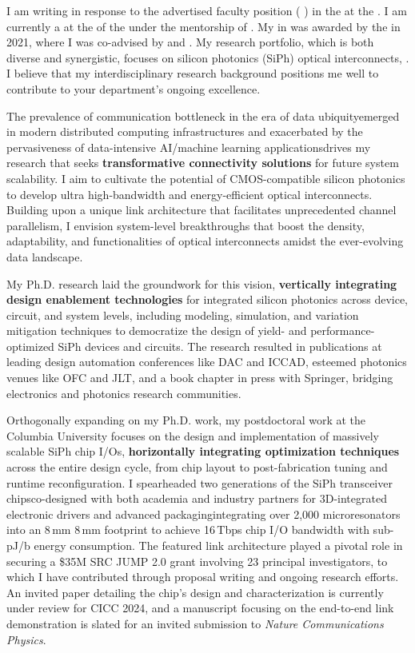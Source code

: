 I am writing in response to the advertised faculty position (\textbf{\appPosition{} \appJobID}) in the \appDept{} at the \appSchool{}. I am currently a \myTitle{} at the \myDept{} of the \mySchoolShort{} under the mentorship of \mySuper{}. My \myDegree{} in \myMajor{} was awarded by the \myPhDSchool{} in 2021, where I was co-advised by \myAdvisor{} and \myCoAdvisor{}. My research portfolio, which is both diverse and synergistic, focuses on silicon photonics (SiPh) optical interconnects, \appSpecific{}. I believe that my interdisciplinary research background positions me well to contribute to your department's ongoing excellence.

The prevalence of communication bottleneck in the era of data ubiquity\textemdash emerged in modern distributed computing infrastructures and exacerbated by the pervasiveness of data-intensive AI/machine learning applications\textemdash drives my research that seeks \textbf{transformative connectivity solutions} for future system scalability. I aim to cultivate the potential of CMOS-compatible silicon photonics to develop ultra high-bandwidth and energy-efficient optical interconnects. Building upon a unique link architecture that facilitates unprecedented channel parallelism, I envision system-level breakthroughs that boost the density, adaptability, and functionalities of optical interconnects amidst the ever-evolving data landscape.

My Ph.D. research laid the groundwork for this vision, \textbf{vertically integrating design enablement technologies} for integrated silicon photonics across device, circuit, and system levels, including modeling, simulation, and variation mitigation techniques to democratize the design of yield- and performance-optimized SiPh devices and circuits. The research resulted in publications at leading design automation conferences like DAC and ICCAD, esteemed photonics venues like OFC and JLT, and a book chapter in press with Springer, bridging electronics and photonics research communities.

Orthogonally expanding on my Ph.D. work, my postdoctoral work at the Columbia University focuses on the design and implementation of massively scalable SiPh chip I/Os, \textbf{horizontally integrating optimization techniques} across the entire design cycle, from chip layout to post-fabrication tuning and runtime reconfiguration. I spearheaded two generations of the SiPh transceiver chips\textemdash co-designed with both academia and industry partners for 3D-integrated electronic drivers and advanced packaging\textemdash integrating over 2,000 microresonators into an 8\,mm \texttimes{} 8\,mm footprint to achieve 16\,Tbps chip I/O bandwidth with sub-pJ/b energy consumption. The featured link architecture played a pivotal role in securing a \$35M SRC JUMP 2.0 grant involving 23 principal investigators, to which I have contributed through proposal writing and ongoing research efforts. An invited paper detailing the chip's design and characterization is currently under review for CICC 2024, and a manuscript focusing on the end-to-end link demonstration is slated for an invited submission to \emph{Nature Communications Physics}.

